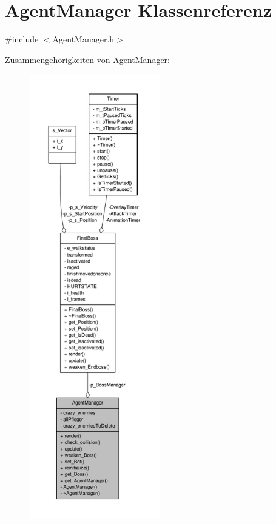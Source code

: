 \hypertarget{class_agent_manager}{\section{Agent\-Manager Klassenreferenz}
\label{class_agent_manager}
}


{\ttfamily \#include $<$Agent\-Manager.\-h$>$}



Zusammengehörigkeiten von Agent\-Manager\-:
\nopagebreak
\begin{figure}[H]
\begin{center}
\leavevmode
\includegraphics[height=550pt]{class_agent_manager__coll__graph}
\end{center}
\end{figure}
